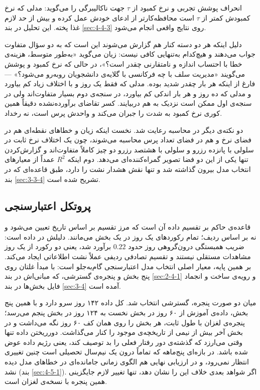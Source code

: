 انحراف پوشش تجربی و نرخ کمبود از $\tau$ جهت ناکالیبرگی را می‌گوید: مدلی که نرخ کمبودش
کمتر از $\tau$ است محافظه‌کارتر از ادعای خودش عمل کرده و بیش از حد لازم غذا پخته. این
تحلیل در بند \ref{sec:4-4-3} روی نتایج واقعی انجام می‌شود.

دلیل اینکه هر دو دسته کنار هم گزارش می‌شوند این است که به دو سؤال متفاوت جواب می‌دهند و
هیچ‌کدام به‌تنهایی کافی نیست: زیان  می‌گوید «به‌طور متوسط، هزینه‌ی خطا با
احتساب اندازه و نامتقارنی چقدر است؟»، در حالی که نرخ کمبود و پوشش می‌گویند «مدیریت سلف
با چه فرکانسی با گلایه‌ی دانشجویان روبه‌رو می‌شود؟» — فارغ از اینکه هر بار چقدر شدید بوده.
مدلی که فقط یک روز و با اختلاف زیاد کم بیاورد و مدلی که ده روز و هر بار اندکی کم
بیاورد، در سنجه‌ی دوم بسیار متفاوت‌اند ولی در سنجه‌ی اول ممکن است نزدیک به هم دربیایند.
کسر تقاضای برآورده‌نشده دقیقاً همین کوری نرخ کمبود به شدت را جبران می‌کند و واحدش پرس
است، نه رخداد.

دو نکته‌ی دیگر در محاسبه رعایت شد. نخست اینکه زیان  و خطاهای نقطه‌ای هم در
فضای نرخ و هم در فضای تعداد پرس محاسبه می‌شوند، چون یک اختلاف نرخ ثابت در سلولی با
پانزده رزرو و سلولی با هشتصد رزرو دو چیز کاملاً متفاوت‌اند و گزارش‌کردن تنها یکی از این
دو فضا تصویر گمراه‌کننده‌ای می‌دهد. دوم اینکه $R^2$ عمداً از معیارهای انتخاب مدل بیرون
گذاشته شد و تنها نقش هشدار نشت را دارد، طبق قاعده‌ای که در بند \ref{sec:3-3-4} تشریح
شده است.

\subsection{پروتکل اعتبارسنجی}
\label{sec:4-3-2}

قاعده‌ی حاکم بر تقسیم داده آن است که مرز تقسیم بر اساس تاریخ تعیین می‌شود و نه بر اساس
ردیف؛ تمام رکوردهای یک روز در یک بخش می‌مانند. دلیلش در داده است: ضریب همبستگی
درون‌گروهی روز حدود $0.22$ برآورد شد، یعنی دو رکورد از یک روز مشاهدات مستقلی نیستند و
تقسیم تصادفی ردیفی عملاً نشت اطلاعاتی ایجاد می‌کند. بر همین پایه، معیار اصلی انتخاب مدل
اعتبارسنجی گام‌به‌جلو است: با مبدأ غلتان روی پنج بخش و پنجره‌ی گسترشی، که
مبانی‌اش در بند \ref{sec:2-4-1} و
رویه‌ی ساخت و انجماد فایل بخش‌ها در بند \ref{sec:3-4} آمده است.

میان دو صورت پنجره، گسترشی انتخاب شد. کل داده ۱۴۲ روز سرو دارد و با همین پنج بخش،
داده‌ی آموزش از ۶۰ روز در بخش نخست به ۱۲۴ روز در بخش پنجم می‌رسد؛ پنجره‌ی لغزان با طول
ثابت، هر بخش را روی همان کف ۶۰ روز نگه می‌داشت و در بخش آخر بیش از نیمی از تاریخچه‌ی
موجود را کنار می‌گذاشت. دورریختن داده تنها وقتی می‌ارزد که گذشته‌ی دور رفتار فعلی را بد
توصیف کند، یعنی رژیم داده عوض شده باشد. در بازه‌ای پنج‌ماهه که تماماً درون یک نیم‌سال
تحصیلی است چنین تغییری انتظار نمی‌رود، و در ارزیابی نهایی هم الگوی زمانی جامانده‌ای در
خطاهای مدل دیده نشد (بند \ref{sec:4-5-1}). اگر شواهد بعدی خلاف این را نشان دهد، تنها
تغییر لازم جایگزینی همین پنجره با نسخه‌ی لغزان است.

